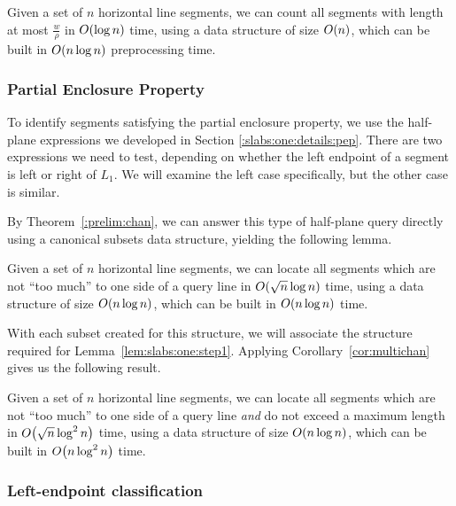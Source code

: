\begin{lemma}
\label{lem:slabs:one:step1}
Given a set of $n$ horizontal line segments, we can count all segments with length at most $\frac{w}{\rho}$ in $O\!\left(\log{n}\right)$ time, using a data structure of size $O\!\left(n\right)$, which can be built in $O\!\left(n \log{n}\right)$ preprocessing time.
\end{lemma}


\subsubsection{Partial Enclosure Property}

To identify segments satisfying the partial enclosure property, we use the half-plane expressions we developed in Section \ref{:slabs:one:details:pep}.
There are two expressions we need to test, depending on whether the left endpoint of a segment is left or right of $L_1$.
We will examine the left case specifically, but the other case is similar.

By Theorem~\ref{:prelim:chan}, we can answer this type of half-plane query directly using a canonical subsets data structure, yielding the following lemma.

\begin{lemma}
\label{lem:slabs:one:step2a}
Given a set of $n$ horizontal line segments, we can locate all segments which are not ``too much'' to one side of a query line in $O\!\left(\sqrt{n}\log{n}\right)$ time, using a data structure of size $O\!\left(n\log{n}\right)$, which can be built in $O\!\left(n\log{n}\right)$ time.
\end{lemma}

With each subset created for this structure, we will associate the structure required for Lemma~\ref{lem:slabs:one:step1}.
Applying Corollary~\ref{cor:multichan} gives us the following result.

\begin{lemma}
\label{lem:slabs:one:step2b}
Given a set of $n$ horizontal line segments, we can locate all segments which are not ``too much'' to one side of a query line \emph{and} do not exceed a maximum length in $O\!\left(\sqrt{n}\log^2{n}\right)$ time, using a data structure of size $O\!\left(n\log{n}\right)$, which can be built in $O\!\left(n\log^2{n}\right)$ time.
\end{lemma}


\subsubsection{Left-endpoint classification}

